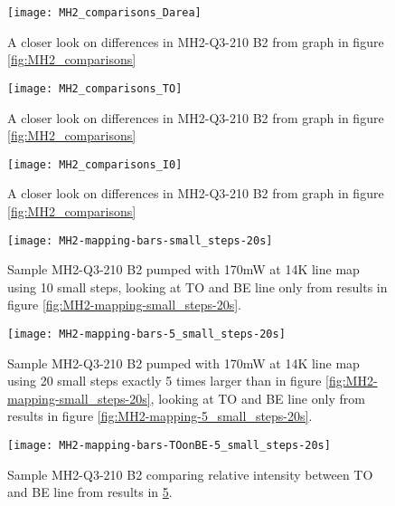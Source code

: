 \begin{figure}[H]
\centering
\texttt{[image: MH2\_comparisons\_Darea]}
\caption[MH2-Q3-210 comparisons close]{A closer look on differences in MH2-Q3-210 B2 from graph in figure \ref{fig:MH2_comparisons} }
\label{fig:MH2_comparisons_Darea}%
\end{figure}

\begin{figure}[H]
\centering
\texttt{[image: MH2\_comparisons\_TO]}
\caption[MH2-Q3-210 comparisons close]{A closer look on differences in MH2-Q3-210 B2 from graph in figure \ref{fig:MH2_comparisons} } 
\label{fig:MH2_comparisons_TO}%
\end{figure}

\begin{figure}[H]
\centering
\texttt{[image: MH2\_comparisons\_I0]}
\caption[MH2-Q3-210 comparisons close]{A closer look on differences in MH2-Q3-210 B2 from graph in figure \ref{fig:MH2_comparisons} } 
\label{fig:MH2_comparisons_I0}%
\end{figure}




\begin{figure}[H]
\centering
\texttt{[image: MH2-mapping-bars-small\_steps-20s]}
\caption[MH2-Q3-210 line mapping]{Sample MH2-Q3-210 B2 pumped with 170mW at 14K line map using 10 small steps, looking at TO and BE line only from results in figure \ref{fig:MH2-mapping-small_steps-20s}.}
\label{fig:MH2-mapping-bars-small_steps-20s}%
\end{figure}

\begin{figure}[H]
\centering
\texttt{[image: MH2-mapping-bars-5\_small\_steps-20s]}
\caption[MH2-Q3-210 line mapping]{Sample MH2-Q3-210 B2 pumped with 170mW at 14K line map using 20 small steps exactly 5 times larger than in figure \ref{fig:MH2-mapping-small_steps-20s}, looking at TO and BE line only from results in figure \ref{fig:MH2-mapping-5_small_steps-20s}.}
\label{fig:MH2-mapping-bars-5_small_steps-20s}%
\end{figure}


\begin{figure}[H]
\centering
\texttt{[image: MH2-mapping-bars-TOonBE-5\_small\_steps-20s]}
\caption[MH2-Q3-210 line mapping]{Sample MH2-Q3-210 B2 comparing relative intensity between TO and BE line from results in \ref{fig:MH2-mapping-bars-5_small_steps-20s}.}
\label{fig:MH2-mapping-bars-TOonBE-5_small_steps-20s}%
\end{figure}



